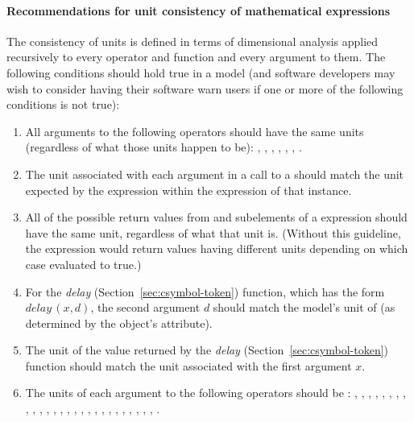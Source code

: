 \paragraph{Recommendations for unit consistency of mathematical expressions}

The consistency of units is defined in terms of dimensional
analysis applied recursively to every operator and function and
every argument to them.  The following conditions should hold true
in a model (and software developers may wish to consider having
their software warn users if one or more of the following
conditions is not true):

\begin{enumerate}

\item All arguments to the following operators should have the same
  units (regardless of what those units happen to be):
  , , ,  ,
  , , .

\item The unit associated with each argument in a call to a
  \FunctionDefinition should match the unit expected by the
   expression within the  expression of
  that \FunctionDefinition instance.


\item All of the possible return values from  and
   subelements of a  expression
  should have the same unit, regardless of what that unit is.
  (Without this guideline, the  expression would
  return values having different units depending on which case
  evaluated to true.)

\item For the \emph{delay} 
  (Section~\ref{sec:csymbol-token}) function, which has the form
  $\textit{delay}\,(x, d)$, the second argument $d$ should match
  the model's unit of  (as determined by the \Model
  object's  attribute).

\item The unit of the value returned by the \emph{delay}
   (Section~\ref{sec:csymbol-token}) function
  should match the unit associated with the first argument $x$.

\item The units of each argument to the following operators should
  be : , , ,
  , , , ,
  , , , ,
  , , , ,
  , , , ,
  , , , ,
  , , ,
  , .


\end{enumerate}
